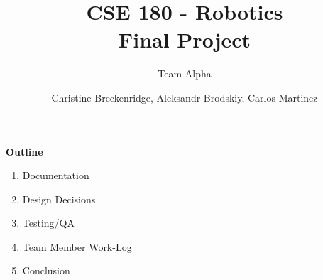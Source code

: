 \documentclass[12pt]{article}
\title{CSE 180 - Robotics \\ Final Project}
\subtitle{Team Alpha}
\author{Christine Breckenridge, Aleksandr Brodskiy, Carlos Martinez}
\begin{document}
\maketitle
{\setlength{\parindent}{0cm}
\textbf{Outline}
\begin{enumerate}  
\item Documentation
\item Design Decisions
\item Testing/QA
\item Team Member Work-Log
\item Conclusion\\\\\\\\\\\\\\\\\\\\\\\\\\\\
\end{enumerate} 
}
\end{document}
